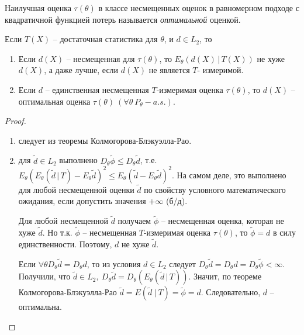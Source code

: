 \begin{definition}
    Наилучшая оценка $\tau(\theta)$ в классе несмещенных оценок в равномерном подходе с квадратичной функцией потерь называется \textit{оптимальной} оценкой.
\end{definition}
\begin{corollary}
    Если $T(X)$ -- достаточная статистика для $\theta$, и $d\in L_2$, то
    \begin{enumerate}
        \item Если $d(X)$ -- несмещенная для $\tau(\theta)$, то $E_\theta(d(X)\, \vert\, T(X))$ не хуже $d(X)$, а даже лучше, если $d(X)$ не является $T$- измеримой.
        \item Если $d$ -- единственная несмещенная $T$-измеримая оценка $\tau(\theta)$, то $d(X)$ -- оптимальная оценка $\tau(\theta)\ (\forall \theta\ P_\theta-a.s.)$.
    \end{enumerate}
\end{corollary}
\begin{proof} ~
    \begin{enumerate}
        \item следует из теоремы Колмогорова-Блэкуэлла-Рао.
        \item для $\widetilde{d} \in L_2$ выполнено $D_\theta\widetilde{\phi} \leq D_\theta\widetilde{d}$, т.е. $E_\theta\left(E_\theta\left(\widetilde{d}\, \vert\, T\right) - E_\theta\widetilde{d}\right)^2 \leq E_\theta\left(\widetilde{d} - E_\theta\widetilde{d}\right)^2$. На самом деле, это выполнено для любой несмещенной оценки $\widetilde{d}$ по свойству условного математического ожидания, если допустить значения $+\infty$ (б/д).
        
        Для любой несмещенной $\widetilde{d}$ получаем $\widetilde{\phi}$ -- несмещенная оценка, которая не хуже $\widetilde{d}$. Но т.к. $\widetilde{\phi}$ -- несмещенная $T$-измеримая оценка $\tau(\theta)$, то $\widetilde{\phi} = d$ в силу единственности. Поэтому, $d$ не хуже $\widetilde{d}$.
        
        Если $\forall \theta D_\theta\widetilde{d} = D_\theta d$, то из условия $d \in L_2$ следует $D_\theta\widetilde{d} = D_\theta d = D_\theta\widetilde{\phi} < \infty$. Получили, что $\tilde{d} \in L_{2},\ D_{\theta }\tilde{d}=D_{\theta }\left( E_{\theta}\left(\tilde{d}\, \vert\, T\right)\right)$. Значит, по теореме Колмогорова-Блэкуэлла-Рао $\displaystyle \tilde{d} =E\left(\tilde{d} \ |\ T\right) =\tilde{\phi } =d$. Следовательно, $\displaystyle d$ -- оптимальна.
    \end{enumerate}
\end{proof}